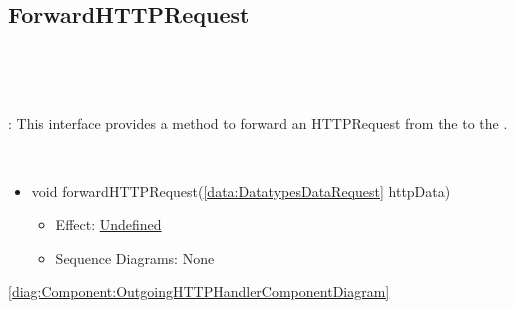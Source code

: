   \subsection{ForwardHTTPRequest}\label{int:InterfacesForwardHTTPRequest}
    \begin{description}
      \item[Provided by:] \iconcomponent{}~
      \item[Required by:] \iconcomponent{}~ 
           \item[Description]: This interface provides a method to forward an HTTPRequest from the  to the .
      \item[Operations:] ~
    \begin{itemize}[noitemsep,nolistsep,leftmargin=-.25cm]
      \item \textsf{void forwardHTTPRequest(\ref{data:DatatypesDataRequest} httpData)}
        \begin{itemize}[noitemsep,nolistsep]
           \item Effect: {\colorbox{red!30}{\underline{Undefined}}} 
           \item Sequence Diagrams: None
        \end{itemize}
    \end{itemize}
      \item[Diagrams:] \cref{diag:Component:OutgoingHTTPHandlerComponentDiagram}
    \end{description}

